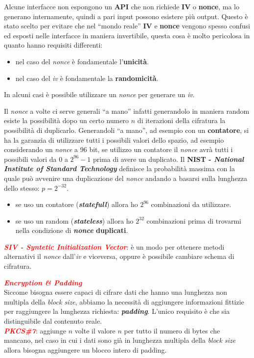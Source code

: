 \begin{flushleft}
    Alcune interfacce non espongono un \textbf{API} che non richiede \textbf{IV} o \textbf{nonce}, ma lo generano internamente, quindi a pari input possono esistere più output. Questo è stato scelto per evitare che nel ``mondo reale'' \textbf{IV} e \textbf{nonce} vengono spesso confusi ed esposti nelle interfacce in maniera invertibile, questa cosa è molto pericolosa in quanto hanno requisiti differenti:
    \begin{itemize}[nosep]
        \item nel caso del \textit{nonce} è fondamentale l'\textbf{unicità}.
        \item nel caso del \textit{iv} è fondamentale la \textbf{randomicità}.
    \end{itemize}
    In alcuni casi è possibile utilizzare un \textit{nonce} per generare un \textit{iv}. 

    \medskip

    Il \textit{nonce} a volte ci serve generali ``a mano'' infatti generandolo in maniera random esiste la possibilità dopo un certo numero $n$ di iterazioni della cifratura la possibilità di duplicarlo. Generandoli ``a mano'', ad esempio con un \textbf{contatore}, si ha la garanzia di utilizzare tutti i possibili valori dello spazio, ad esempio considerando un \textit{nonce} a 96 bit, se utilizzo un contatore il \textit{nonce} avrà tutti i possibili valori da $0$ a $2^{96} - 1$ prima di avere un duplicato. Il \textbf{NIST - \textit{National Institute of Standard Technology}} definisce la probabilità massima con la quale può avvenire una duplicazione del \textit{nonce} andando a basarsi sulla lunghezza dello stesso: $p = 2^{-32}$.
    \begin{itemize}[nosep]
        \item se uso un contatore (\textbf{\textit{statefull}}) allora ho $2^{96}$ combinazioni da utilizzare.
        \item se uso un random (\textbf{\textit{stateless}}) allora ho $2^{32}$ combinazioni prima di trovarmi nella condizione di \textbf{\textit{nonce} duplicati}.
    \end{itemize}

    \textcolor{red}{\textbf{\textit{SIV - Syntetic Initialization Vector}}}: è un modo per ottenere metodi alternativi il \textit{nonce} dall'\textit{iv} e viceversa, oppure è possibile cambiare schema di cifratura.

    \medskip

    \textcolor{red}{\textbf{\textit{Encryption \& Padding}}} \\
    Siccome bisogna essere capaci di cifrare dati che hanno una lunghezza non multipla della \textit{block size}, abbiamo la necessità di aggiungere informazioni fittizie per raggiungere la lunghezza richiesta: \textbf{\textit{padding}}. L'unico requisito è che sia distinguibile dal contenuto reale. \\
    \textcolor{red}{\textbf{\textit{PKCS\#7}}}: aggiunge $n$ volte il valore $n$ per tutto il numero di bytes che mancano, nel caso in cui i dati sono già in lunghezza multipla della \textit{block size} allora bisogna aggiungere un blocco intero di padding.


\end{flushleft}

